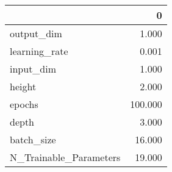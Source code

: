 \begin{tabular}{lr}
\toprule
{} &        0 \\
\midrule
output\_dim             &    1.000 \\
learning\_rate          &    0.001 \\
input\_dim              &    1.000 \\
height                 &    2.000 \\
epochs                 &  100.000 \\
depth                  &    3.000 \\
batch\_size             &   16.000 \\
N\_Trainable\_Parameters &   19.000 \\
\bottomrule
\end{tabular}
